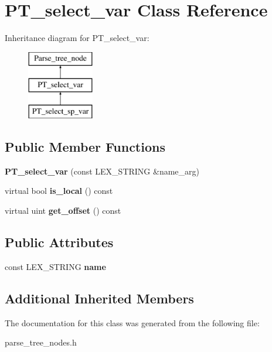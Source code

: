 \hypertarget{classPT__select__var}{}\section{P\+T\+\_\+select\+\_\+var Class Reference}
\label{classPT__select__var}
Inheritance diagram for P\+T\+\_\+select\+\_\+var\+:\begin{figure}[H]
\begin{center}
\leavevmode
\includegraphics[height=3.000000cm]{classPT__select__var}
\end{center}
\end{figure}
\subsection*{Public Member Functions}
\begin{DoxyCompactItemize}
\item 
\mbox{\label{classPT__select__var_aa293031a17fbfd35861769dae031d42a}} 
{\bfseries P\+T\+\_\+select\+\_\+var} (const L\+E\+X\+\_\+\+S\+T\+R\+I\+NG \&name\+\_\+arg)
\item 
\mbox{\label{classPT__select__var_a651f192bdb96b4db209874b86dffa32c}} 
virtual bool {\bfseries is\+\_\+local} () const
\item 
\mbox{\label{classPT__select__var_aa9558ed5230f3fb379b988004ab9329c}} 
virtual uint {\bfseries get\+\_\+offset} () const
\end{DoxyCompactItemize}
\subsection*{Public Attributes}
\begin{DoxyCompactItemize}
\item 
\mbox{\label{classPT__select__var_a1509ad90bd77da1a6ab9ea460babc493}} 
const L\+E\+X\+\_\+\+S\+T\+R\+I\+NG {\bfseries name}
\end{DoxyCompactItemize}
\subsection*{Additional Inherited Members}


The documentation for this class was generated from the following file\+:\begin{DoxyCompactItemize}
\item 
parse\+\_\+tree\+\_\+nodes.\+h\end{DoxyCompactItemize}
